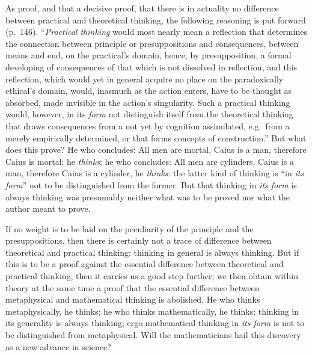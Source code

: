 \documentclass[12pt]{book}
\newcommand{\opage}[1]{\marginnote{\footnotesize\textit{[#1]}}}
\begin{document}
As proof, and that a decisive proof, that there is in actuality no
difference between practical and theoretical thinking, the following
\opage{24}\setcounter{footnote}{0}%
reasoning is put forward (p.\ 146). ``\emph{Practical thinking} would most
nearly mean a reflection that determines the connection between principle
or presuppositions and consequences, between means and end, on the
practical's domain, hence, by presupposition, a formal developing of
consequences of that which is not dissolved in reflection, and this
reflection, which would yet in general acquire no place on the
paradoxically ethical's domain, would, inasmuch as the action enters,
have to be thought as absorbed, made invisible in the action's
singularity. Such a practical thinking would, however, in its \emph{form}
not distinguish itself from the theoretical thinking that draws
consequences from a not yet by cognition assimilated, e.g.\ from a merely
empirically determined, or that forms concepts of construction.'' But
what does this prove? He who concludes: All men are mortal, Caius is a
man, therefore Caius is mortal; he \emph{thinks}; he who concludes: All
men are cylinders, Caius is a man, therefore Caius is a cylinder, he
\emph{thinks}: the latter kind of thinking is
``in \emph{its form}'' not to be distinguished from the former. But that
thinking in \emph{its form} is always thinking was presumably neither what
was to be proved nor what the author meant to prove.

If no weight is to be laid on the peculiarity of the principle and the
presuppositions, then there is certainly not a trace of difference
between theoretical and practical thinking: thinking in general is always
thinking. But if this is to be a proof against the essential difference
between theoretical and practical thinking, then it carries us a good
step further; we then obtain within theory at the same time a proof that
the essential difference between metaphysical and mathematical thinking
is abolished.
He who thinks metaphysically, he thinks; he who thinks mathematically, he
thinks: thinking in its
\opage{25}\setcounter{footnote}{0}%
generality is always thinking; ergo mathematical thinking in \emph{its
form} is not to be distinguished from metaphysical. Will the
mathematicians hail this discovery as a new advance in science?
\end{document}
